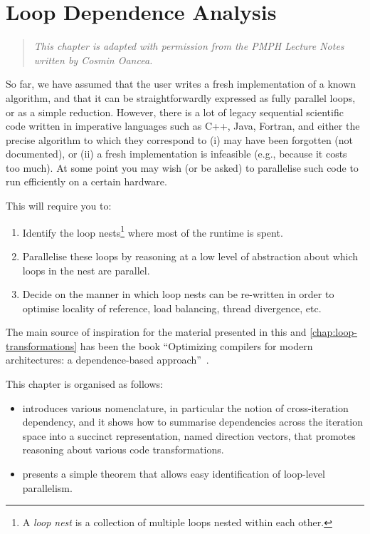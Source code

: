 \lstset{language=C}

\chapter{Loop Dependence Analysis}
\label{chap:dependencies}

\begin{quote}
  \emph{This chapter is adapted with permission from the PMPH Lecture
    Notes written by Cosmin Oancea.}
\end{quote}

So far, we have assumed that the user writes a fresh implementation of
a known algorithm, and that it can be straightforwardly expressed as
fully parallel loops, or as a simple reduction.  However, there is a
lot of legacy sequential scientific code written in imperative
languages such as C++, Java, Fortran, and either the precise algorithm
to which they correspond to (i) may have been forgotten (not
documented), or (ii) a fresh implementation is infeasible (e.g.,
because it costs too much).  At some point you may wish (or be asked)
to parallelise such code to run efficiently on a certain hardware.

This will require you to:

\begin{enumerate}
\item Identify the loop nests\footnote{A \emph{loop nest} is a
    collection of multiple loops nested within each other.} where most
  of the runtime is spent.

\item Parallelise these loops by reasoning at a low level of
  abstraction about which loops in the nest are parallel.

\item Decide on the manner in which loop nests can be re-written in
  order to optimise locality of reference, load balancing, thread
  divergence, etc.
\end{enumerate}

The main source of inspiration for the material presented in this and
\cref{chap:loop-transformations} has been the book ``Optimizing
compilers for modern architectures: a dependence-based
approach''~\cite{kennedy2001optimizing}.

This chapter is organised as follows:
\begin{itemize}
\item {} introduces various nomenclature,
  in particular the notion of cross-iteration dependency, and
  it shows how to summarise dependencies across the iteration
  space into a succinct representation, named direction vectors,
  that promotes reasoning about various code transformations.
\item {} presents a simple theorem that allows easy
  identification of loop-level parallelism.
\end{itemize}

